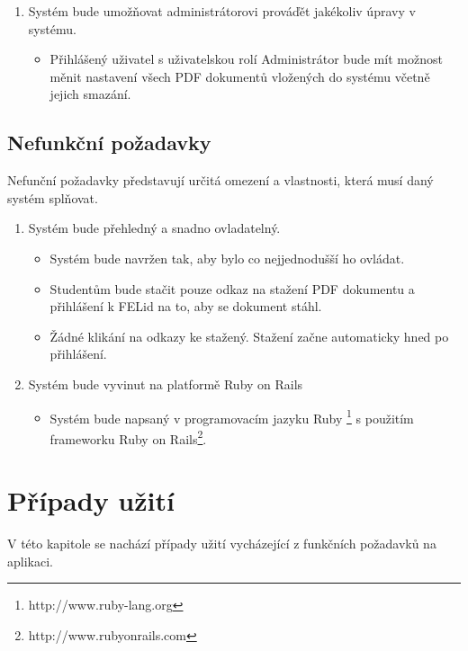 \begin{enumerate}
    \item Systém bude umožňovat administrátorovi prováďět jakékoliv úpravy v systému.
        \begin{itemize}
            \item Přihlášený uživatel s uživatelskou rolí Administrátor bude mít možnost měnit nastavení všech PDF dokumentů vložených do systému včetně jejich smazání.
        \end{itemize}

\end{enumerate}

\subsection{Nefunkční požadavky}
Nefunční požadavky představují určitá omezení a vlastnosti, která musí daný systém splňovat.\cite{UMLBOOK}

\begin{enumerate}
    \item Systém bude přehledný a snadno ovladatelný.
        \begin{itemize} 
            \item Systém bude navržen tak, aby bylo co nejjednodušší ho ovládat.
            \item Studentům bude stačit pouze odkaz na stažení PDF dokumentu a přihlášení k FELid na to, aby se dokument stáhl.
            \item Žádné klikání na odkazy ke stažený. Stažení začne automaticky hned po přihlášení.
        \end{itemize}
    \item Systém bude vyvinut na platformě Ruby on Rails
        \begin{itemize}
            \item Systém bude napsaný v programovacím jazyku Ruby \footnote{http://www.ruby-lang.org} s použitím frameworku Ruby on Rails\footnote{http://www.rubyonrails.com}.
        \end{itemize}
\end{enumerate}

\section{Případy užití}
V této kapitole se nachází případy užití vycházející z funkčních požadavků na aplikaci. 

